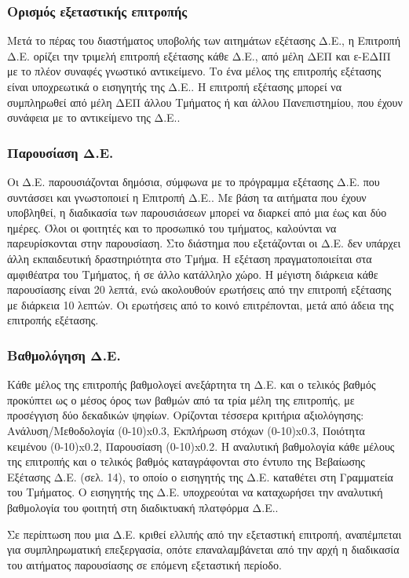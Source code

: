 \documentclass[twoside, a4paper, 11pt]{article}
\begin{document}
\subsubsection{Ορισμός εξεταστικής επιτροπής}
Μετά το πέρας του διαστήματος υποβολής των αιτημάτων εξέτασης Δ.Ε., η Επιτροπή Δ.Ε. ορίζει την τριμελή επιτροπή εξέτασης κάθε Δ.Ε., από μέλη ΔΕΠ και ε-ΕΔΙΠ με το πλέον συναφές γνωστικό αντικείμενο. Το ένα μέλος της επιτροπής εξέτασης είναι υποχρεωτικά ο εισηγητής της Δ.Ε.. Η επιτροπή εξέτασης μπορεί να συμπληρωθεί από μέλη ΔΕΠ άλλου Τμήματος ή και άλλου Πανεπιστημίου, που έχουν συνάφεια με το αντικείμενο της Δ.Ε.. 

\subsubsection{Παρουσίαση Δ.Ε.}
Οι Δ.Ε. παρουσιάζονται δημόσια, σύμφωνα με το πρόγραμμα εξέτασης Δ.Ε. που συντάσσει και γνωστοποιεί η Επιτροπή Δ.Ε.. Με βάση τα αιτήματα που έχουν υποβληθεί, η διαδικασία των παρουσιάσεων μπορεί να διαρκεί από μια έως και δύο ημέρες. Όλοι οι φοιτητές και το προσωπικό του τμήματος, καλούνται να παρευρίσκονται στην παρουσίαση. Στο διάστημα που εξετάζονται οι Δ.Ε. δεν υπάρχει άλλη εκπαιδευτική δραστηριότητα στο Τμήμα. Η εξέταση πραγματοποιείται στα αμφιθέατρα του Τμήματος, ή σε άλλο κατάλληλο χώρο. Η μέγιστη διάρκεια κάθε παρουσίασης είναι 20 λεπτά, ενώ ακολουθούν ερωτήσεις από την επιτροπή εξέτασης με διάρκεια 10 λεπτών. Οι ερωτήσεις από το κοινό επιτρέπονται, μετά από άδεια της επιτροπής εξέτασης. 

\subsubsection{Βαθμολόγηση Δ.Ε.}
Κάθε μέλος της επιτροπής βαθμολογεί ανεξάρτητα τη Δ.Ε. και ο τελικός βαθμός προκύπτει ως ο μέσος όρος των βαθμών από τα τρία μέλη της επιτροπής, με προσέγγιση δύο δεκαδικών ψηφίων. Ορίζονται τέσσερα κριτήρια αξιολόγησης: Ανάλυση/Μεθοδολογία (0-10)x0.3, Εκπλήρωση στόχων (0-10)x0.3, Ποιότητα κειμένου (0-10)x0.2, Παρουσίαση (0-10)x0.2. Η αναλυτική βαθμολογία κάθε μέλους της επιτροπής και ο τελικός βαθμός καταγράφονται στο έντυπο της Βεβαίωσης Εξέτασης Δ.Ε. (σελ. 14), το οποίο ο εισηγητής της Δ.Ε. καταθέτει στη Γραμματεία του Τμήματος. Ο εισηγητής της Δ.Ε. υποχρεούται να καταχωρήσει την αναλυτική βαθμολογία του φοιτητή στη διαδικτυακή πλατφόρμα Δ.Ε..

Σε περίπτωση που μια Δ.Ε. κριθεί ελλιπής από την εξεταστική επιτροπή, αναπέμπεται για συμπληρωματική επεξεργασία, οπότε επαναλαμβάνεται από την αρχή η διαδικασία του αιτήματος παρουσίασης σε επόμενη εξεταστική περίοδο.
\end{document}
